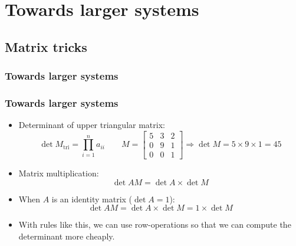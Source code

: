 \documentclass[11pt,table,final,xcolor={usenames,dvipsnames,table}]{beamer}
\begin{document}
\section{Towards larger systems}
\subsection*{Matrix tricks}

\begin{frame}[fragile]
  \frametitle{Towards larger systems}
\end{frame}

\begin{frame}[fragile]
  \frametitle{Towards larger systems}
  \begin{itemize}
    \item Determinant of upper triangular matrix:
    \[
    \det{M_\text{tri}} = \prod_{i=1}^n a_{ii} \qquad M=\begin{bmatrix}
5 & 3 & 2 \\ 
0 & 9 & 1 \\
0 & 0 & 1
\end{bmatrix} \Rightarrow \det{M} = 5 \times 9 \times 1 = 45
    \]
  \item Matrix multiplication:
  \[
  \det{AM}=\det{A}\times\det{M}
  \]
  \item When $A$ is an identity matrix ($\det{A}=1$):
  \[
   \det{AM}=\det{A}\times\det{M} = 1\times\det{M}
  \]
  \item With rules like this, we can use row-operations so that we can compute the determinant more cheaply.
  \end{itemize}
\end{frame}
\end{document}

